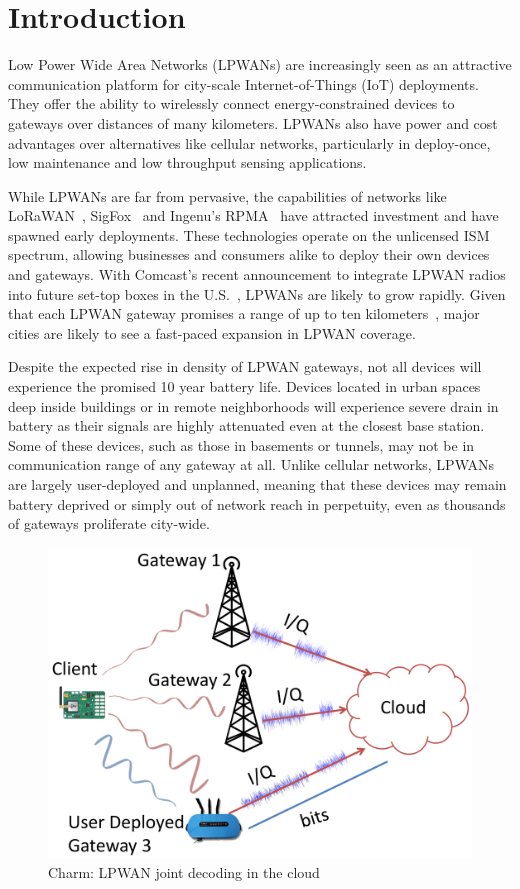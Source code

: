 
\section{Introduction}
\label{sec:intro}

Low Power Wide Area Networks (LPWANs) are increasingly seen as an attractive
communication platform for city-scale Internet-of-Things (IoT) deployments.
They offer the ability to wirelessly connect energy-constrained devices to
gateways over distances of many kilometers. LPWANs also have power and cost
advantages over alternatives like cellular networks, particularly in
deploy-once, low maintenance and low throughput sensing applications.

While LPWANs are far from pervasive, the capabilities of networks like
LoRaWAN~\cite{Sornin2015, LoRaWanAlliance2015}, SigFox~\cite{centenaro2016}
and Ingenu's RPMA~\cite{Ingenu2015} have attracted investment and have spawned
early deployments. These technologies operate on the unlicensed ISM spectrum,
allowing businesses and consumers alike to deploy their own devices and
gateways. With Comcast’s recent announcement to integrate LPWAN radios into
future set-top boxes in the U.S.~\cite{comcast, comcast2}, LPWANs are likely
to grow rapidly. Given that each LPWAN gateway promises a range of up to ten
kilometers~\cite{LoRaWanAlliance2015}, major cities are likely to see a
fast-paced expansion in LPWAN coverage.

Despite the expected rise in density of LPWAN gateways, not all devices will
experience the promised 10 year battery life. Devices located in urban spaces
deep inside buildings or in remote neighborhoods will experience severe drain
in battery as their signals are highly attenuated even at the closest base
station. Some of these devices, such as those in basements or tunnels, may not
be in communication range of any gateway at all. Unlike cellular networks,
LPWANs are largely user-deployed and unplanned, meaning that these devices may
remain battery deprived or simply out of network reach in perpetuity, even as
thousands of gateways proliferate city-wide.

\begin{figure}[tb]
    \centering
    \includegraphics[width=0.60\columnwidth]{figures/LoRaRAN_cropped}
    \vspace*{-10 pt}
    \caption{Charm: LPWAN joint decoding in the cloud}
    \compactimg
    \label{fig:my_label}
\end{figure}

